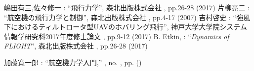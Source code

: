 
\begin{thebibliography}{99}


嶋田有三,佐々修一 : ``飛行力学'', 森北出版株式会社 , pp.26-28 (2017)
片柳亮二 : ``航空機の飛行力学と制御'', 森北出版株式会社 , pp.4-17 (2007)
吉村啓史 : ``強風下におけるティルトロータ型UAVのホバリング飛行'', 神戸大学大学院システム情報学研究科2017年度修士論文 , pp.9-12 (2017)
B. Etkin, : ``\textit{Dynamics of FLIGHT}'', 森北出版株式会社 , pp.26-28 (2017)



加藤寛一郎 : ``航空機力学入門,'' , no. , pp.  ()

\end{thebibliography}

\newpage

